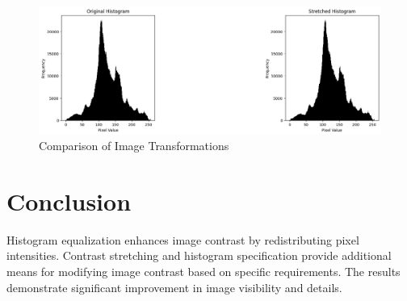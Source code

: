 \documentclass{report}
\begin{document}
\begin{figure}[h]
    \includegraphics[width=\textwidth]{images/Exp-6-Results-3.png}
    \caption{Comparison of Image Transformations}
    \label{fig:noisy}
\end{figure}

\section{Conclusion}
Histogram equalization enhances image contrast by redistributing pixel intensities. Contrast stretching and histogram specification provide additional means for modifying image contrast based on specific requirements. The results demonstrate significant improvement in image visibility and details.
\end{document}
